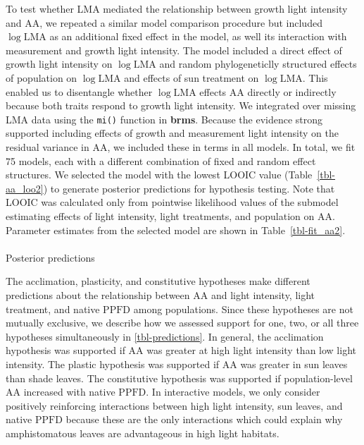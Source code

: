 \documentclass[
  letterpaper,
  DIV=11,
  numbers=noendperiod]{scrartcl}
\makeatletter
\let\oldparagraph\paragraph
\renewcommand{\paragraph}{
    \@ifstar
      \xxxParagraphStar
      \xxxParagraphNoStar
  }
\newcommand{\xxxParagraphStar}[1]{\oldparagraph*{#1}\mbox{}}
\newcommand{\xxxParagraphNoStar}[1]{\oldparagraph{#1}\mbox{}}
\newcommand{\aax}{$\mathrm{AA}$}
\newcommand{\ppfd}{$\mathrm{PPFD}$}
\makeatother
\begin{document}
To test whether LMA mediated the relationship between growth light
intensity and \aax{}, we repeated a similar model comparison procedure
but included \(\log \mathrm{LMA}\) as an additional fixed effect in the
model, as well its interaction with measurement and growth light
intensity. The model included a direct effect of growth light intensity
on \(\log \mathrm{LMA}\) and random phylogeneticlly structured effects
of population on \(\log \mathrm{LMA}\) and effects of sun treatment on
\(\log \mathrm{LMA}\). This enabled us to disentangle whether
\(\log \mathrm{LMA}\) effects \aax{} directly or indirectly because both
traits respond to growth light intensity. We integrated over missing LMA
data using the \texttt{mi()} function in \textbf{brms}. Because the
evidence strong supported including effects of growth and measurement
light intensity on the residual variance in \(\mathrm{AA}\), we included
these in terms in all models. In total, we fit 75 models, each with a
different combination of fixed and random effect structures. We selected
the model with the lowest LOOIC value (Table~\ref{tbl-aa_loo2}) to
generate posterior predictions for hypothesis testing. Note that LOOIC
was calculated only from pointwise likelihood values of the submodel
estimating effects of light intensity, light treatments, and population
on \aax{}. Parameter estimates from the selected model are shown in
Table~\ref{tbl-fit_aa2}.

\paragraph{Posterior predictions}\label{sec-predictions}

The acclimation, plasticity, and constitutive hypotheses make different
predictions about the relationship between \aax{} and light intensity,
light treatment, and native \ppfd{} among populations. Since these
hypotheses are not mutually exclusive, we describe how we assessed
support for one, two, or all three hypotheses simultaneously in
\autoref{tbl-predictions}. In general, the acclimation hypothesis was
supported if \aax{} was greater at high light intensity than low light
intensity. The plastic hypothesis was supported if \aax{} was greater in
sun leaves than shade leaves. The constitutive hypothesis was supported
if population-level \aax{} increased with native \ppfd. In interactive
models, we only consider positively reinforcing interactions between
high light intensity, sun leaves, and native \ppfd{} because these are
the only interactions which could explain why amphistomatous leaves are
advantageous in high light habitats.
\end{document}
